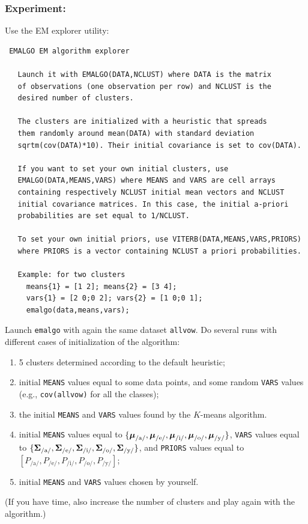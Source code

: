 \documentclass[a4paper]{article}
\newcommand{\com}[1]{{\tt #1}}
\newcommand{\muv}{\ensuremath\boldsymbol{\mu}}  %
\newcommand{\Sm}{\ensuremath\boldsymbol{\Sigma}}  %
\begin{document}
\subsubsection*{Experiment:}
Use the EM explorer utility:
\begin{verbatim}
 EMALGO EM algorithm explorer

   Launch it with EMALGO(DATA,NCLUST) where DATA is the matrix
   of observations (one observation per row) and NCLUST is the
   desired number of clusters.

   The clusters are initialized with a heuristic that spreads
   them randomly around mean(DATA) with standard deviation
   sqrtm(cov(DATA)*10). Their initial covariance is set to cov(DATA).

   If you want to set your own initial clusters, use
   EMALGO(DATA,MEANS,VARS) where MEANS and VARS are cell arrays
   containing respectively NCLUST initial mean vectors and NCLUST
   initial covariance matrices. In this case, the initial a-priori
   probabilities are set equal to 1/NCLUST.

   To set your own initial priors, use VITERB(DATA,MEANS,VARS,PRIORS)
   where PRIORS is a vector containing NCLUST a priori probabilities.

   Example: for two clusters
     means{1} = [1 2]; means{2} = [3 4];
     vars{1} = [2 0;0 2]; vars{2} = [1 0;0 1];
     emalgo(data,means,vars);

\end{verbatim}
Launch \com{emalgo} with again the same dataset \com{allvow}. Do
several runs with different cases of initialization of the algorithm:
\begin{enumerate}
\item 5 clusters determined according to the default heuristic;
\item initial \com{MEANS} values equal to some data points, and some
  random \com{VARS} values (e.g., \com{cov(allvow)} for all the
  classes);
\item the initial \com{MEANS} and \com{VARS} values found by the
  $K$-means algorithm.
\item initial \com{MEANS} values equal to $\{\muv_{\text{/a/}},
  \muv_{\text{/e/}}, \muv_{\text{/i/}}, \muv_{\text{/o/}},
  \muv_{\text{/y/}}\}$, \com{VARS} values equal to \linebreak
  $\{\Sm_{\text{/a/}}, \Sm_{\text{/e/}}, \Sm_{\text{/i/}},
  \Sm_{\text{/o/}}, \Sm_{\text{/y/}}\}$, and \com{PRIORS} values
  equal to
  $[P_{\text{/a/}},P_{\text{/e/}},P_{\text{/i/}},P_{\text{/o/}},P_{\text{/y/}}]$;
\item initial \com{MEANS} and \com{VARS} values chosen by yourself.
\end{enumerate}
(If you have time, also increase the number of clusters and play again with
the algorithm.)
\end{document}
